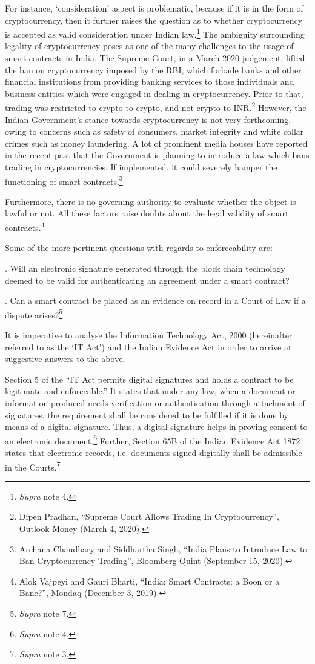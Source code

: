 \begin{multicols}{2}
\noi
For instance, ‘consideration’ aspect is problematic, because if it is in the form of
cryptocurrency, then it further raises the question as to whether cryptocurrency is accepted as valid consideration under Indian law.\footnote{\textit{Supra} note 4.} The ambiguity surrounding legality of cryptocurrency
poses as one of the many challenges to the usage of smart contracts in India. The Supreme
Court, in a March 2020 judgement, lifted the ban on cryptocurrency imposed by the RBI,
which forbade banks and other financial institutions from providing banking services to those
individuals and business entities which were engaged in dealing in cryptocurrency. Prior to
that, trading was restricted to crypto-to-crypto, and not crypto-to-INR.\footnote{Dipen Pradhan, “Supreme Court Allows Trading In Cryptocurrency”, Outlook Money (March 4, 2020).} However, the Indian
Government’s stance towards cryptocurrency is not very forthcoming, owing to concerns
such as safety of consumers, market integrity and white collar crimes such as money
laundering. A lot of prominent media houses have reported in the recent past that the
Government is planning to introduce a law which bans trading in cryptocurrencies. If
implemented, it could severely hamper the functioning of smart contracts.\footnote{Archana Chaudhary and Siddhartha Singh, “India Plans to Introduce Law to Ban Cryptocurrency Trading”,
Bloomberg Quint (September 15, 2020).}

\noi
Furthermore, there is no governing authority to evaluate whether the object is lawful or not.
All these factors raise doubts about the legal validity of smart contracts.\footnote{Alok Vajpeyi and Gauri Bharti, “India: Smart Contracts: a Boon or a Bane?”, Mondaq (December 3, 2019).}

\noi
Some of the more pertinent questions with regards to enforceability are: 

. Will an electronic signature generated through the block chain technology deemed to be
valid for authenticating an agreement under a smart contract? 

. Can a smart contract be placed as an evidence on record in a Court of Law if a dispute
arises?\footnote{\textit{Supra} note 7.}

\noi
It is imperative to analyse the Information Technology Act, 2000 (hereinafter referred to as
the ‘IT Act’) and the Indian Evidence Act in order to arrive at suggestive answers to the
above.

\noi
Section 5 of the “IT Act permits digital signatures and holds a contract to be legitimate and
enforceable.” It states that under any law, when a document or information produced needs verification or authentication through attachment of signatures, the requirement shall be
considered to be fulfilled if it is done by means of a digital signature. Thus, a digital signature
helps in proving consent to an electronic document.\footnote{\textit{Supra} note 4.} Further, Section 65B of the Indian
Evidence Act 1872 states that electronic records, i.e. documents signed digitally shall be
admissible in the Courts.\footnote{\textit{Supra} note 3.}


\end{multicols}
